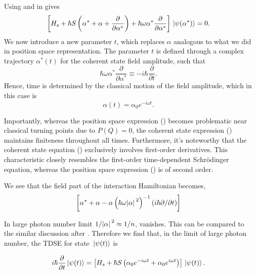 Using  and  in  gives
\begin{equation}
    \label{eq:class_jcm_eq26}
    \left[H_s + \hbar S \left(\alpha^* + \alpha + 
    \dfrac{\partial}{\partial  \alpha^*}\right) 
    + \hbar \omega \alpha^* \dfrac{\partial}{\partial \alpha^*} \right] \ket*{\psi(\alpha^*)} = 0.
\end{equation}
We now introduce a new parameter \(t\), which replaces \(\alpha\) analogous to what we did 
in position space representation. The parameter \(t\) is defined through a complex trajectory 
\(\alpha^*(t)\) for the coherent state field amplitude, such that 
\begin{equation}
    \label{eq:class_jcm_eq27}
    \hbar \omega \alpha^* \dfrac{\partial}{\partial \alpha^*} \equiv 
    -i \hbar\dfrac{\partial}{\partial t}.
 \end{equation}
Hence, time is determined by the classical motion of the field amplitude, which in this case is 
\begin{equation}
    \label{eq:class_jcm_eq28}
    \alpha(t) = \alpha_0 e^{-i\omega t}.
\end{equation}

Importantly, whereas the position space expression () becomes 
problematic near classical turning 
points due to $P(Q) = 0$, the coherent state expression () maintains finiteness throughout all times. 
Furthermore, it's noteworthy that the coherent state equation () exclusively involves first-order 
derivatives. This characteristic closely resembles the first-order time-dependent Schrödinger 
equation, whereas the position space expression () is of second order.

We see that the field part of the interaction Hamiltonian becomes, 
\begin{eqnarray}
    \label{eq:class_jcm_eq29}
    \left[\alpha^* + \alpha - \alpha \left(\hbar \omega \abs*{\alpha}^2\right)^{-1}
    \left(i \hbar \partial / \partial t\right) \right]
\end{eqnarray}

In large photon number limit \(1/\abs*{\alpha}^2 \approx 1/n\), vanishes. This can be 
compared to the similar discussion after . Therefore we find that, in 
the limit of large photon number, the TDSE for state \(\ket*{\psi(t)}\) is 
\begin{mdframed}
    \begin{equation}
        \label{eq:class_jcm_eq30}
        i\hbar \dfrac{\partial}{\partial t} \ket*{\psi(t)} = \left[
            H_s +  \hbar S \left(\alpha_0 e^{-i \omega t} + \alpha_0 e^{i \omega t}\right) 
        \right] \ket*{\psi(t)}.
    \end{equation}
\end{mdframed}

